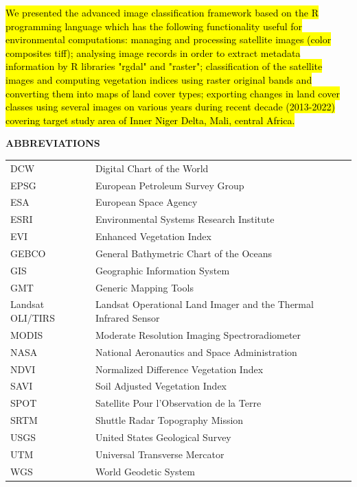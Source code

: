 \documentclass[12pt,a4paper,oneside]{article}
\def \newsection{\vspace{12pt}\textbf}
\def \newpar{\vspace{6pt}}
\begin{document}
\newpar \hl{We presented the advanced image classification framework based on the R programming language which has the following functionality useful for environmental computations: managing and processing satellite images (color composites tiff); analysing image records in order to extract metadata information by R libraries "rgdal" and "raster"; classification of the satellite images and computing vegetation indices using raster original bands  and converting them into maps of land cover types; exporting changes in land cover classes using several images on various years during recent decade (2013-2022) covering target study area of Inner Niger Delta, Mali, central Africa.}

\vspace{12pt}

\newsection {ABBREVIATIONS}
\vspace{12pt}

\begin{tabular}{@{}ll}
DCW & Digital Chart of the World \\
EPSG & European Petroleum Survey Group \\
ESA & European Space Agency \\
ESRI & Environmental Systems Research Institute \\
EVI & Enhanced Vegetation Index \\
GEBCO & General Bathymetric Chart of the Oceans \\
GIS & Geographic Information System \\
GMT & Generic Mapping Tools \\
Landsat OLI/TIRS & Landsat Operational Land Imager and the Thermal Infrared Sensor \\
MODIS & Moderate Resolution Imaging Spectroradiometer \\
NASA & National Aeronautics and Space Administration \\
NDVI & Normalized Difference Vegetation Index \\
SAVI & Soil Adjusted Vegetation Index \\
SPOT & Satellite Pour l'Observation de la Terre \\
SRTM & Shuttle Radar Topography Mission \\
USGS & United States Geological Survey \\
UTM & Universal Transverse Mercator \\
WGS & World Geodetic System \\
\end{tabular}
\end{document}
